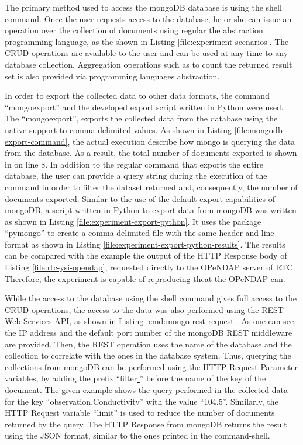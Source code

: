 The primary method used to access the mongoDB database is using the shell
command. Once the user requests access to the database, he or she can issue an
operation over the collection of documents using regular the abstraction
programming language, as the shown in Listing \ref{file:experiment-scenarios}.
The CRUD operations are available to the user and can be used at any time to
any database collection. Aggregation operations such as to count the returned
result set is also provided via programming languages abstraction.

In order to export the collected data to other data formats, the  command
``mongoexport'' and the developed export script written in Python were used.
The ``mongoexport'', exports the collected data from the database using the
native support to comma-delimited values. As shown in Listing
\ref{file:mongodb-export-command}, the actual execution describe how mongo is
querying the data from the database. As a result, the total number of documents
exported is shown in on line 8. In addition to the regular command that
exports the entire database, the user can provide a query string during the
execution of the command in order to filter the dataset returned and,
consequently, the number of documents exported. Similar to the use of the
default export capabilities of mongoDB, a script written in Python to export
data from mongoDB was written as shown in Listing
\ref{file:experiment-export-python}. It uses the package ``pymongo'' to create
a comma-delimited file with the same header and line format as shown in Listing
\ref{file:experiment-export-python-results}. The results can be compared with
the example the output of the HTTP Response body of Listing
\ref{file:rtc-ysi-opendap}, requested directly to the OPeNDAP server of RTC.
Therefore, the experiment is capable of reproducing theat the OPeNDAP can.

While the access to the database using the shell command gives full access to 
the CRUD operations, the access to the data was also performed using the REST
Web Services API, as shown in Listing \ref{cmd:mongo-rest-request}. As one can
see, the IP address and the default port number of the mongoDB REST middleware
are provided. Then, the REST operation uses the name of the database and
the collection to correlate with the ones in the database system. Thus,
querying the collections from mongoDB can be performed using the HTTP Request
Parameter variables, by adding the prefix ``filter\underline{ }'' before the
name of the key of the document. The given example shows the query performed
in the collected data for the key ``observation.Conductivity'' with the value
``104.5''. Similarly, the HTTP Request variable ``limit'' is used to reduce
the number of documents returned by the query. The HTTP Response from mongoDB
returns the result using the JSON format, similar to the ones printed in the
command-shell.

